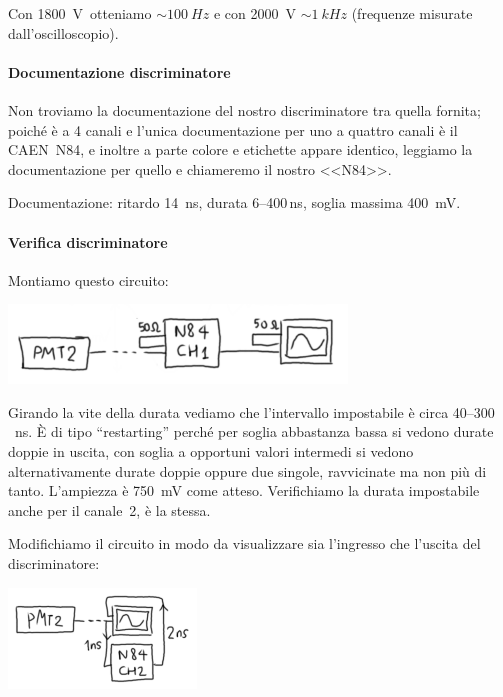 \documentclass[a4paper]{article}
\begin{document}
Con \SI{1800}V otteniamo $\sim\SI{100}{Hz}$ e con \SI{2000}V $\sim\SI{1}{kHz}$
(frequenze misurate dall'oscilloscopio).


\paragraph{Documentazione discriminatore}

Non troviamo la documentazione del nostro discriminatore tra quella fornita;
poiché è a 4 canali e l'unica documentazione per uno a quattro canali è il CAEN~N84,
e inoltre a parte colore e etichette appare identico,
leggiamo la documentazione per quello e chiameremo il nostro <<N84>>.

Documentazione:
ritardo \SI{14}{ns},
durata 6--400\,\si{ns},
soglia massima \SI{400}{mV}.

\paragraph{Verifica discriminatore}

Montiamo questo circuito:

\includegraphics[width=9cm]{fig4a}

Girando la vite della durata vediamo che l'intervallo impostabile è circa 40--300\si{\,ns}.
È di tipo ``restarting'' perché per soglia abbastanza bassa si vedono durate doppie in uscita,
con soglia a opportuni valori intermedi si vedono alternativamente durate doppie oppure due singole, ravvicinate ma non più di tanto.
L'ampiezza è \SI{750}{mV} come atteso.
Verifichiamo la durata impostabile anche per il canale~2, è la stessa.

Modifichiamo il circuito in modo da visualizzare sia l'ingresso che l'uscita del discriminatore:

\includegraphics[width=5cm]{fig4b}
\end{document}
